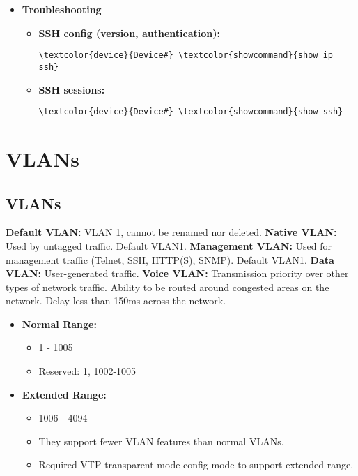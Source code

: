 \documentclass[10pt, a4paper, onecolumn, oneside, titlepage, openany]{book}
\begin{document}
\begin{itemize}
    \item \textbf{Troubleshooting}
    \begin{itemize}
        \item \textbf{SSH config (version, authentication):}
\begin{Verbatim}[commandchars=\\\{\}]
\textcolor{device}{Device#} \textcolor{showcommand}{show ip ssh}
\end{Verbatim}
        \item \textbf{SSH sessions:}
\begin{Verbatim}[commandchars=\\\{\}]
\textcolor{device}{Device#} \textcolor{showcommand}{show ssh}
\end{Verbatim}
    \end{itemize}
\end{itemize}

\chapter{VLANs}
\section{VLANs}
\textbf{Default VLAN:} VLAN 1, cannot be renamed nor deleted.
\newline \textbf{Native VLAN:} Used by untagged traffic. Default VLAN1.
\newline \textbf{Management VLAN:} Used for management traffic (Telnet, SSH, HTTP(S), SNMP). Default VLAN1.
\newline \textbf{Data VLAN:} User-generated traffic.
\newline \textbf{Voice VLAN:} Transmission priority over other types of network traffic. Ability to be routed around congested areas on the network. Delay less than 150ms across the network.
\begin{itemize}
    \item \textbf{Normal Range:}
    \begin{itemize}
        \item 1 - 1005
        \item Reserved: 1, 1002-1005
    \end{itemize}
    \item \textbf{Extended Range:}
    \begin{itemize}
        \item 1006 - 4094
        \item They support fewer VLAN features than normal VLANs.
        \item Required VTP transparent mode config mode to support extended range.
    \end{itemize}
\end{itemize}
\end{document}
